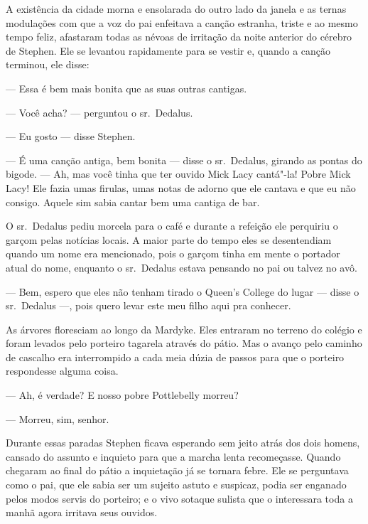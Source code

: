 A existência da cidade morna e ensolarada do outro lado da janela e as
ternas modulações com que a voz do pai enfeitava a canção estranha,
triste e ao mesmo tempo feliz, afastaram todas as névoas de irritação
da noite anterior do cérebro de Stephen. Ele se levantou rapidamente
para se vestir e, quando a canção terminou, ele disse:

 --- Essa é bem mais bonita que as suas outras cantigas.

 --- Você acha? --- perguntou o sr.~Dedalus.

 --- Eu gosto --- disse Stephen.

 --- É uma canção antiga, bem bonita --- disse o sr.~Dedalus, girando as
pontas do bigode. --- Ah, mas você tinha que ter ouvido Mick Lacy cantá"-la!
Pobre Mick Lacy! Ele fazia umas firulas, umas notas de adorno que ele
cantava e que eu não consigo. Aquele sim sabia cantar bem uma cantiga
de bar.

O sr.~Dedalus pediu morcela para o café e durante a refeição ele
perquiriu o garçom pelas notícias locais. A maior parte do tempo eles
se desentendiam quando um nome era mencionado, pois o garçom tinha em
mente o portador atual do nome, enquanto o sr.~Dedalus estava pensando
no pai ou talvez no avô.

 --- Bem, espero que eles não tenham tirado o Queen’s
College do lugar --- disse o sr.~Dedalus ---, pois quero levar este meu filho
aqui pra conhecer.

As árvores floresciam ao longo da Mardyke. Eles entraram no terreno do
colégio e foram levados pelo porteiro tagarela através do pátio. Mas o
avanço pelo caminho de cascalho era interrompido a cada meia dúzia de
passos para que o porteiro respondesse alguma coisa.

 --- Ah, é verdade? E nosso pobre Pottlebelly morreu?

 --- Morreu, sim, senhor.

Durante essas paradas Stephen ficava esperando sem jeito atrás dos dois
homens, cansado do assunto e inquieto para que a marcha lenta
recomeçasse. Quando chegaram ao final do pátio a inquietação já se
tornara febre. Ele se perguntava como o pai, que ele sabia ser um
sujeito astuto e suspicaz, podia ser enganado pelos modos servis do
porteiro; e o vivo sotaque sulista que o interessara toda a manhã agora
irritava seus ouvidos.

